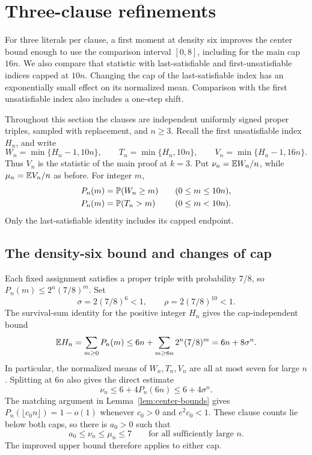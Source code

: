 \section{Three-clause refinements}\label{sec:three-clause}

For three literals per clause, a first moment at density six improves
the center bound enough to use the comparison interval \([0,8]\),
including for the main cap \(16n\). We also compare that statistic with
last-satisfiable and first-unsatisfiable indices capped at \(10n\).
Changing the cap of the last-satisfiable index has an exponentially
small effect on its normalized mean. Comparison with the first
unsatisfiable index also includes a one-step shift.

Throughout this section the clauses are independent uniformly signed
proper triples, sampled with replacement, and \(n\ge3\). Recall the
first unsatisfiable index \(H_n\), and write
\begin{equation}\label{eq:three-statistics}
 W_n=\min\{H_n-1,10n\},\qquad
 T_n=\min\{H_n,10n\},\qquad
 V_n=\min\{H_n-1,16n\}.
\end{equation}
Thus \(V_n\) is the statistic of the main proof at \(k=3\). Put
\(\nu_n=\mathbb E W_n/n\), while \(\mu_n=\mathbb E V_n/n\) as before.
For integer \(m\),
\begin{equation}\label{eq:three-survival}
\begin{aligned}
 P_n(m)&=\mathbb P(W_n\ge m)&&\quad(0\le m\le10n),\\
 P_n(m)&=\mathbb P(T_n>m)&&\quad(0\le m<10n).
\end{aligned}
\end{equation}
Only the last-satisfiable identity includes its capped endpoint.

\subsection{The density-six bound and changes of cap}

Each fixed assignment satisfies a proper triple with probability \(7/8\),
so \(P_n(m)\le2^n(7/8)^m\). Set
\[
 \sigma=2(7/8)^6<1,\qquad \rho=2(7/8)^{10}<1.
\]
The survival-sum identity for the positive integer \(H_n\) gives the
cap-independent bound
\begin{equation}\label{eq:three-h-mean}
 \mathbb E H_n=\sum_{m\ge0}P_n(m)
 \le6n+\sum_{m\ge6n}2^n(7/8)^m
 =6n+8\sigma^n.
\end{equation}
In particular, the normalized means of \(W_n,T_n,V_n\) are all at most
seven for large \(n\). Splitting at \(6n\) also gives the direct estimate
\begin{equation}\label{eq:three-center}
 \nu_n\le6+4P_n(6n)\le6+4\sigma^n.
\end{equation}
The matching argument in Lemma~\ref{lem:center-bounds} gives
\(P_n(\lfloor c_0n\rfloor)=1-o(1)\) whenever \(c_0>0\) and
\(e^2c_0<1\). These clause counts lie below both caps, so there is
\(a_0>0\) such that
\begin{equation}\label{eq:three-anchors}
 a_0\le\nu_n\le\mu_n\le7
 \qquad\text{for all sufficiently large }n.
\end{equation}
The improved upper bound therefore applies to either cap.

